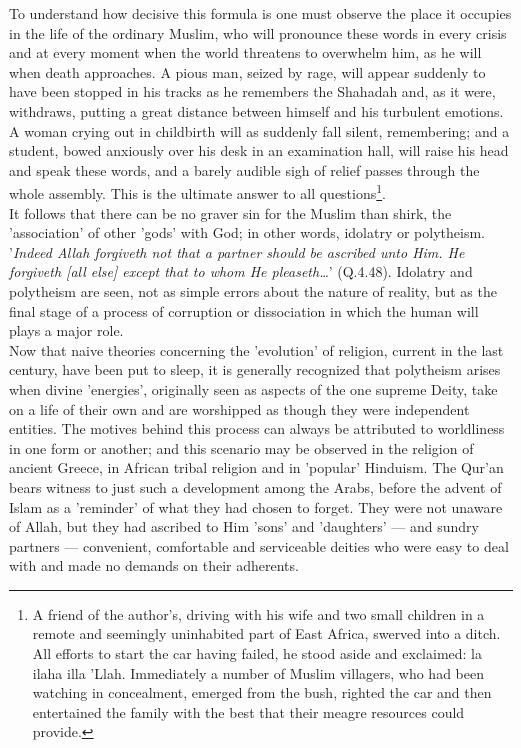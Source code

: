 \documentclass[10pt, twoside]{book}
\begin{document}
To understand how decisive this formula is one must observe the place it occupies in the life of the 
ordinary Muslim, who will pronounce these words in every crisis and at every moment when the world 
threatens to overwhelm him, as he will when death approaches. A pious man, seized by rage, will 
appear suddenly to have been stopped in his tracks as he remembers the Shahadah and, as it were, 
withdraws, putting a great distance between himself and his turbulent emotions. A woman crying out in 
childbirth will as suddenly fall silent, remembering; and a student, bowed anxiously over his desk in 
an examination hall, will raise his head and speak these words, and a barely audible sigh of relief 
passes through the whole assembly. This is the ultimate answer to all questions\footnote{A friend of the author's, driving with his wife and two small children in a remote and seemingly uninhabited part of East Africa, swerved into a ditch. All efforts to start the car having failed, he stood aside and exclaimed: la ilaha illa 'Llah. Immediately a number of Muslim villagers, who had been watching in concealment, emerged from the bush, righted the car and then entertained the family with the best that their meagre resources could provide.}. \\

It follows that there can be no graver sin for the Muslim than shirk, the 'association' of other 
'gods' with God; in other words, idolatry or polytheism. '\emph{Indeed Allah forgiveth not that a partner 
should be ascribed unto Him. He forgiveth [all else] except that to whom He pleaseth\ldots{}}' (Q.4.48). 
Idolatry and polytheism are seen, not as simple errors about the nature of reality, but as the final 
stage of a process of corruption or dissociation in which the human will plays a major role. \\

Now that naive theories concerning the 'evolution' of religion, current in the last century, have 
been put to sleep, it is generally recognized that polytheism arises when divine 'energies', 
originally seen as aspects of the one supreme Deity, take on a life of their own and are worshipped 
as though they were independent entities. The motives behind this process can always be attributed to 
worldliness in one form or another; and this scenario may be observed in the religion of ancient 
Greece, in African tribal religion and in 'popular' Hinduism. The Qur'an bears witness to just such a 
development among the Arabs, before the advent of Islam as a 'reminder' of what they had chosen to 
forget. They were not unaware of Allah, but they had ascribed to Him 'sons' and 'daughters' --- and 
sundry partners --- convenient, comfortable and serviceable deities who were easy to deal with and made 
no demands on their adherents. \\
\end{document}
